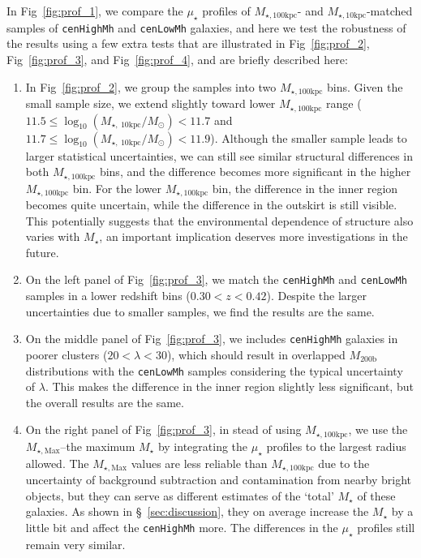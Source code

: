 \documentclass[a4paper,fleqn,usenatbib]{mnras}
\def\rbcg{\texttt{cenHighMh}}
\def\nbcg{\texttt{cenLowMh}}
\def\mstar{{$M_{\star}$}}
\def\mhalo{{$M_{\mathrm{200b}}$}}
\def\minn{{$M_{\star,10\mathrm{kpc}}$}}
\def\mtot{{$M_{\star,100\mathrm{kpc}}$}}
\def\mmax{{$M_{\star,\mathrm{Max}}$}}
\def\mden{{$\mu_{\star}$}}
\begin{document}
    In Fig~\ref{fig:prof_1}, we compare the \mden{} profiles of \mtot{}- and 
    \minn{}-matched samples of \rbcg{} and \nbcg{} galaxies, and here we test the 
    robustness of the results using a few extra tests that are illustrated in
    Fig~\ref{fig:prof_2}, Fig~\ref{fig:prof_3}, and Fig~\ref{fig:prof_4}, and 
    are briefly described here:   
    
    \begin{enumerate}
        
        \item In Fig~\ref{fig:prof_2}, we group the samples into two \mtot{} bins. 
            Given the small sample size, we extend slightly toward lower \mtot{} range 
            ($11.5 \leq \log_{10} (M_{\star,\ 10\mathrm{kpc}}/M_{\odot}) < 11.7$ and 
             $11.7 \leq \log_{10} (M_{\star,\ 10\mathrm{kpc}}/M_{\odot}) < 11.9$). 
            Although the smaller sample leads to larger statistical uncertainties, 
            we can still see similar structural differences in both \mtot{} bins, 
            and the difference becomes more significant in the higher \mtot{} bin.  
            For the lower \mtot{} bin, the difference in the inner region becomes 
            quite uncertain, while the difference in the outskirt is still visible. 
            This potentially suggests that the environmental dependence of structure 
            also varies with \mstar{}, an important implication deserves more 
            investigations in the future.   

        \item On the left panel of Fig~\ref{fig:prof_3}, we match the \rbcg{} and 
            \nbcg{} samples in a lower redshift bins ($0.30 < z < 0.42$).
            Despite the larger uncertainties due to smaller samples, we find the 
            results are the same.
            
        \item On the middle panel of Fig~\ref{fig:prof_3}, we includes \rbcg{} 
            galaxies in poorer clusters ($20 < \lambda < 30$), which should result 
            in overlapped \mhalo{} distributions with the \nbcg{} samples 
            considering the typical uncertainty of $\lambda$.
            This makes the difference in the inner region slightly less significant, 
            but the overall results are the same. 
             
        \item On the right panel of Fig~\ref{fig:prof_3}, in stead of using \mtot{}, 
            we use the \mmax{}--the maximum \mstar{} by integrating the \mden{} 
            profiles to the largest radius allowed.  
            The \mmax{} values are less reliable than \mtot{} due to the 
            uncertainty of background subtraction and contamination from nearby 
            bright objects, but they can serve as different estimates of the `total'
            \mstar{} of these galaxies.
            As shown in \S~\ref{sec:discussion}, they on average increase
            the \mstar{} by a little bit and affect the \rbcg{} more.
            The differences in the \mden{} profiles still remain very similar.
      
    \end{enumerate}
    
\end{document}
